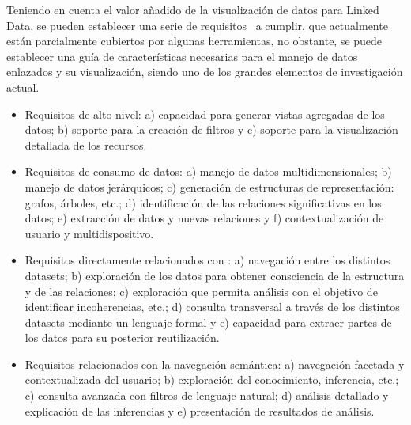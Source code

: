Teniendo en cuenta el valor añadido de la visualización de datos para Linked Data,
 se pueden establecer una serie de requisitos~\cite{journals/semweb/DadzieR11} a cumplir, que actualmente están parcialmente cubiertos 
por algunas herramientas, no obstante, se puede establecer una guía de características necesarias para el manejo de datos enlazados y su 
visualización, siendo uno de los grandes elementos de investigación actual.
\begin{itemize}
 \item Requisitos de alto nivel: a) capacidad para generar vistas agregadas de los datos; b) soporte para la creación de filtros y c) soporte para 
la visualización detallada de los recursos.
\item  Requisitos de consumo de datos: a) manejo de datos multidimensionales; b) manejo de datos jerárquicos;
c) generación de estructuras de representación: grafos, árboles, etc.; d) identificación de las relaciones significativas en los datos;
e) extracción de datos y nuevas relaciones y f) contextualización de usuario y multidispositivo.
\item Requisitos directamente relacionados con \linkeddata: a) navegación entre los distintos datasets; b) exploración de los datos 
para obtener consciencia de la estructura y de las relaciones; c) exploración que permita análisis con el objetivo de identificar incoherencias, etc.;
d) consulta transversal a través de los distintos datasets mediante un lenguaje formal y e) capacidad para extraer partes de los datos para su posterior reutilización.
\item Requisitos relacionados con la navegación semántica: a) navegación facetada y contextualizada del usuario; b) exploración del conocimiento, inferencia, etc.;
c) consulta avanzada con filtros de lenguaje natural; d) análisis detallado y explicación de las inferencias y e) presentación de resultados de análisis.
\end{itemize}




